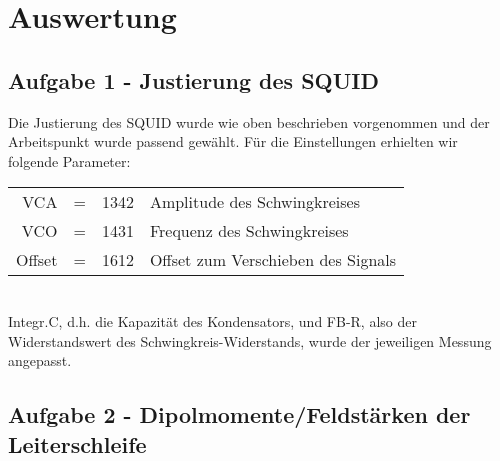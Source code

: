 \begin{flushleft}
\end{flushleft}\clearpage
\section{Auswertung}
\subsection{Aufgabe 1 - Justierung des SQUID}
Die Justierung des SQUID wurde wie oben beschrieben vorgenommen und der Arbeitspunkt wurde passend gewählt. Für die Einstellungen erhielten wir folgende Parameter:\\
\begin{center}
\begin{tabular}{rcll}
VCA & = & 1342 & Amplitude des Schwingkreises \\
VCO & = & 1431 & Frequenz des Schwingkreises \\
Offset & = & 1612 & Offset zum Verschieben des Signals \\
\end{tabular}
\end{center}
~\\
Integr.C, d.h. die Kapazität des Kondensators, und FB-R, also der Widerstandswert des Schwingkreis-Widerstands, wurde der jeweiligen Messung angepasst.
\clearpage
\subsection{Aufgabe 2 - Dipolmomente/Feldstärken der Leiterschleife}
